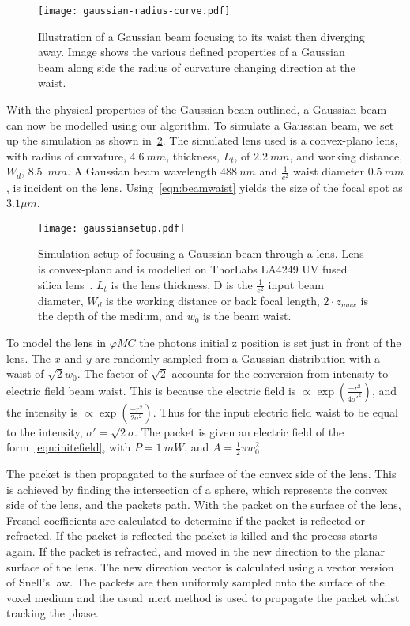 \begin{figure}[!ht]
    \centering
    \texttt{[image: gaussian-radius-curve.pdf]}
    \caption{Illustration of a Gaussian beam focusing to its waist then diverging away. Image shows the various defined properties of a Gaussian beam along side the radius of curvature changing direction at the waist.}
    \label{fig:gbeamills}
\end{figure}

With the physical properties of the Gaussian beam outlined, a Gaussian beam can now be modelled using our algorithm.
To simulate a Gaussian beam, we set up the simulation as shown in~\cref{fig:gausssetup}.
The simulated lens used is a convex-plano lens, with radius of curvature, $4.6~mm$, thickness, $L_t$, of $2.2~mm$, and working distance, $W_d$, 8.5~$mm$.
A Gaussian beam wavelength $488~nm$ and $\tfrac{1}{e^2}$ waist diameter $0.5~mm$, is incident on the lens.
Using~\cref{eqn:beamwaist} yields the size of the focal spot as $3.1\mu m$.

\begin{figure}[!ht]
    \centering
    \texttt{[image: gaussiansetup.pdf]}
    \caption{Simulation setup of focusing a Gaussian beam through a lens. Lens is convex-plano and is modelled on ThorLabs LA4249 UV fused silica lens~\cite{thorlens}.  $L_t$ is the lens thickness, D is the $\tfrac{1}{e^2}$ input beam diameter, $W_d$ is the working distance or back focal length, $2 \cdot z_{max}$ is the depth of the medium, and $w_0$ is the beam waist.}
    \label{fig:gausssetup}
\end{figure}

To model the lens in $\varphi MC$ the photons initial z position is set just in front of the lens.
The $x$ and $y$ are randomly sampled from a Gaussian distribution with a waist of $\sqrt{2}w_0$.
The factor of $\sqrt{2}$ accounts for the conversion from intensity to electric field beam waist.
This is because the electric field is $\propto \exp{\left(\tfrac{-r^2}{4\sigma'^2}\right)}$, and the intensity is $\propto \exp{\left(\tfrac{-r^2}{2\sigma^2}\right)}$.
Thus for the input electric field waist to be equal to the intensity,  $\sigma'=\sqrt{2}\sigma$.
The packet is given an electric field of the form~\cref{eqn:initefield}, with $P=1~mW$, and $A=\tfrac{1}{2}\pi w_0^2$.

The packet is then propagated to the surface of the convex side of the lens.
This is achieved by finding the intersection of a sphere, which represents the convex side of the lens, and the packets path.
With the packet on the surface of the lens, Fresnel coefficients are calculated to determine if the packet is reflected or refracted.
If the packet is reflected the packet is killed and the process starts again.
If the packet is refracted, and moved in the new direction to the planar surface of the lens.
The new direction vector is calculated using a vector version of Snell's law.
The packets are then uniformly sampled onto the surface of the voxel medium and the usual~\gls*{mcrt} method is used to propagate the packet whilst tracking the phase.

